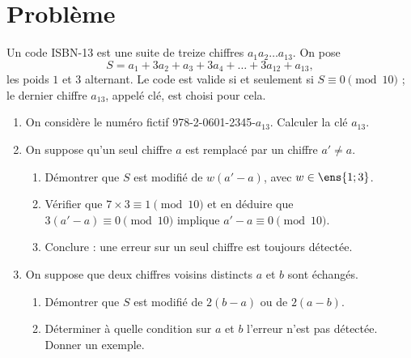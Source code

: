 \mxnewpage
\section{Problème}
\begin{problem}
Un code ISBN-13 est une suite de treize chiffres $a_1a_2\dots a_{13}$. On pose
\[S=a_1+3a_2+a_3+3a_4+\dots+3a_{12}+a_{13},\]
les poids $1$ et $3$ alternant. Le code est valide si et seulement si $S\equiv0\pmod{10}$ ; le dernier chiffre $a_{13}$, appelé clé, est choisi pour cela.
\begin{enumerate}
\item On considère le numéro fictif 978-2-0601-2345-$a_{13}$. Calculer la clé $a_{13}$.
\item On suppose qu'un seul chiffre $a$ est remplacé par un chiffre $a'\neq a$.
\begin{enumerate}
\item Démontrer que $S$ est modifié de $w(a'-a)$, avec $w\in\ens{1;3}$.
\item Vérifier que $7\times3\equiv1\pmod{10}$ et en déduire que $3(a'-a)\equiv0\pmod{10}$ implique $a'-a\equiv0\pmod{10}$.
\item Conclure : une erreur sur un seul chiffre est toujours détectée.
\end{enumerate}
\item On suppose que deux chiffres voisins distincts $a$ et $b$ sont échangés.
\begin{enumerate}
\item Démontrer que $S$ est modifié de $2(b-a)$ ou de $2(a-b)$.
\item Déterminer à quelle condition sur $a$ et $b$ l'erreur n'est pas détectée. Donner un exemple.
\end{enumerate}
\end{enumerate}
\end{problem}
